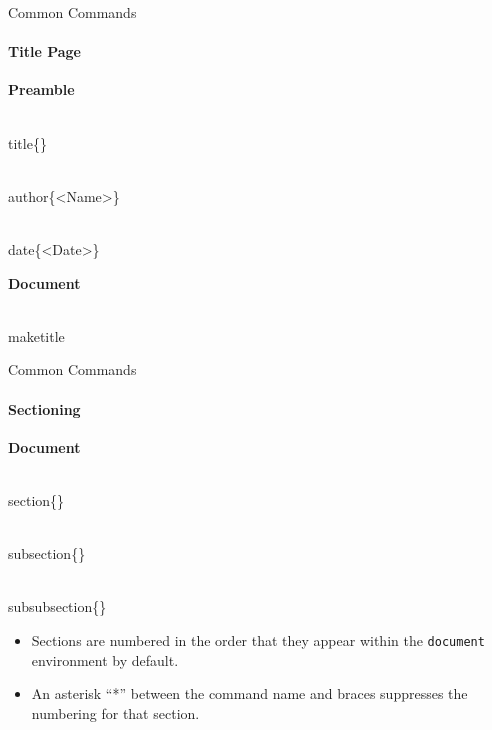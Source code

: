 \documentclass{beamer}
\begin{document}
\begin{frame}{Common Commands}
\framesubtitle{Title Page}
	\textbf{Preamble}
	\begin{semiverbatim}
		\\title\{<Document Title>\}
		
		\\author\{<Name>\}
		
		\\date\{<Date>\}
	\end{semiverbatim}
	\textbf{Document}
	\begin{semiverbatim}
		\\maketitle
	\end{semiverbatim}
\end{frame}

\begin{frame}{Common Commands}
\framesubtitle{Sectioning}
	\textbf{Document}
	\begin{semiverbatim}
		\\section\{<Section Title>\}
		
		\\subsection\{<Subsection Title>\}
		
		\\subsubsection\{<Subsubsection Title>\}
	\end{semiverbatim}
	\begin{itemize}
		\item Sections are numbered in the order that they appear within the \texttt{document} environment by default.
		\item An asterisk ``*'' between the command name and braces suppresses the numbering for that section.
	\end{itemize}
\end{frame}
\end{document}
